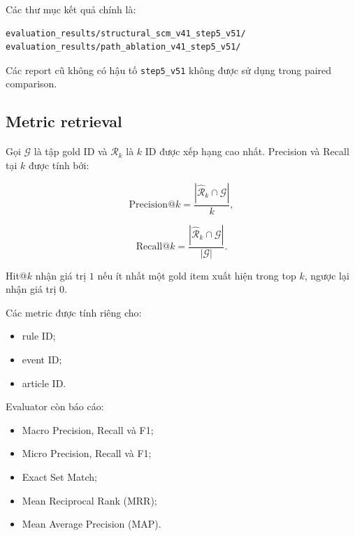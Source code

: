 Các thư mục kết quả chính là:

\begin{verbatim}
evaluation_results/structural_scm_v41_step5_v51/
evaluation_results/path_ablation_v41_step5_v51/
\end{verbatim}

Các report cũ không có hậu tố \texttt{step5\_v51} không được sử dụng trong
paired comparison.

\subsection{Metric retrieval}

Gọi \(\mathcal{G}\) là tập gold ID và
\(\widehat{\mathcal{R}}_k\) là \(k\) ID được xếp hạng cao nhất. Precision và
Recall tại \(k\) được tính bởi:

\begin{equation}
\mathrm{Precision@}k
=
\frac{
    \left|
        \widehat{\mathcal{R}}_k
        \cap
        \mathcal{G}
    \right|
}{
    k
},
\end{equation}

\begin{equation}
\mathrm{Recall@}k
=
\frac{
    \left|
        \widehat{\mathcal{R}}_k
        \cap
        \mathcal{G}
    \right|
}{
    \left|\mathcal{G}\right|
}.
\end{equation}

Hit@\(k\) nhận giá trị \(1\) nếu ít nhất một gold item xuất hiện trong top
\(k\), ngược lại nhận giá trị \(0\).

Các metric được tính riêng cho:

\begin{itemize}
    \item rule ID;
    \item event ID;
    \item article ID.
\end{itemize}

Evaluator còn báo cáo:

\begin{itemize}
    \item Macro Precision, Recall và F1;
    \item Micro Precision, Recall và F1;
    \item Exact Set Match;
    \item Mean Reciprocal Rank (MRR);
    \item Mean Average Precision (MAP).
\end{itemize}

